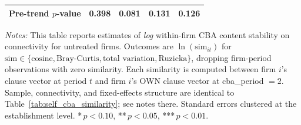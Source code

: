 \begin{table}[H]
\begin{tabular}{lcccc}
Pre-trend $p$-value & 0.398 & 0.081 & 0.131 & 0.126 \\
\hline\hline
\end{tabular}
\begin{minipage}{\linewidth}
\smallskip
\scriptsize\textit{Notes:} This table reports estimates of \emph{log} within-firm CBA content stability on connectivity for untreated firms. Outcomes are $\ln(\text{sim}_{it})$ for $\text{sim} \in \{\text{cosine}, \text{Bray-Curtis}, \text{total variation}, \text{Ruzicka}\}$, dropping firm-period observations with zero similarity. Each similarity is computed between firm $i$'s clause vector at period $t$ and firm $i$'s OWN clause vector at cba\_period $= 2$. Sample, connectivity, and fixed-effects structure are identical to Table~\ref{tab:self_cba_similarity}; see notes there. Standard errors clustered at the establishment level. *\,$p<0.10$, **\,$p<0.05$, ***\,$p<0.01$.
\end{minipage}
\end{table}
